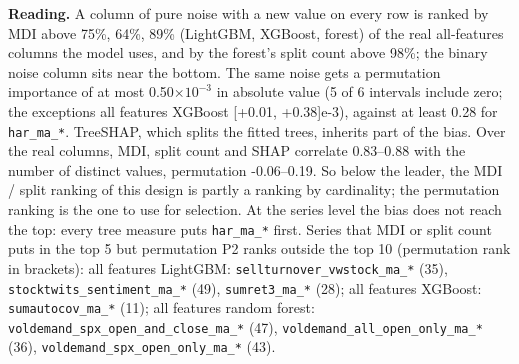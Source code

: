 \documentclass[10pt]{article}
\begin{document}
\textbf{Reading.} A column of pure noise with a new value on every row is ranked by MDI above 75\%, 64\%, 89\% (LightGBM, XGBoost, forest) of the real all-features columns the model uses, and by the forest's split count above 98\%; the binary noise column sits near the bottom. The same noise gets a permutation importance of at most 0.50$\times10^{-3}$ in absolute value (5 of 6 intervals include zero; the exceptions all features XGBoost [+0.01, +0.38]e-3), against at least 0.28 for \texttt{har\_ma\_*}. TreeSHAP, which splits the fitted trees, inherits part of the bias. Over the real columns, MDI, split count and SHAP correlate 0.83--0.88 with the number of distinct values, permutation -0.06--0.19. So below the leader, the MDI / split ranking of this design is partly a ranking by cardinality; the permutation ranking is the one to use for selection. At the series level the bias does not reach the top: every tree measure puts \texttt{har\_ma\_*} first. Series that MDI or split count puts in the top 5 but permutation P2 ranks outside the top 10 (permutation rank in brackets): all features LightGBM: \texttt{sellturnover\_vwstock\_ma\_*} (35), \texttt{stocktwits\_sentiment\_ma\_*} (49), \texttt{sumret3\_ma\_*} (28); all features XGBoost: \texttt{sumautocov\_ma\_*} (11); all features random forest: \texttt{voldemand\_spx\_open\_and\_close\_ma\_*} (47), \texttt{voldemand\_all\_open\_only\_ma\_*} (36), \texttt{voldemand\_spx\_open\_only\_ma\_*} (43).
\end{document}

